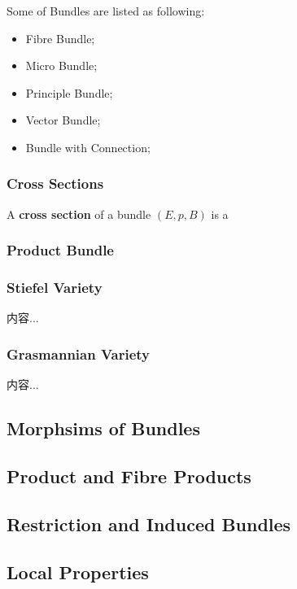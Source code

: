 \documentclass[Total.tex]{subfiles}
\begin{document}
	Some of Bundles are listed as following:
	
	\begin{itemize}
		\item Fibre Bundle;
		\item Micro Bundle;
		\item Principle Bundle;
		\item Vector Bundle;
		\item Bundle with Connection;
	\end{itemize}
	
	\subsubsection{Cross Sections}
	\begin{Def}
		A \textbf{cross section} of a bundle $(E,p,B)$ is a 
	\end{Def}
	
	\subsubsection{Product Bundle}
	
	\subsubsection{Stiefel Variety}
	
	\begin{Def}
		内容...
	\end{Def}
	
	\subsubsection{Grasmannian Variety}
	\begin{Def}
		内容...
	\end{Def}
	\subsection{Morphsims of Bundles}
	\subsection{Product and Fibre Products}
	\subsection{Restriction and Induced Bundles}
	\subsection{Local Properties}
	
\end{document}
